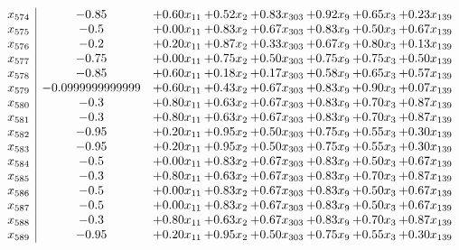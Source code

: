 \documentclass[8pt]{article}
\begin{document}
\[\begin{array}{c| c c@{\hskip 2pt} c@{\hskip 2pt} c@{\hskip 2pt} c@{\hskip 2pt} c@{\hskip 2pt} c@{\hskip 2pt} }
 x_{574}   &  -0.85 & +  0.60 x_{11} & +  0.52 x_{2} & +  0.83 x_{303} & +  0.92 x_{9} & +  0.65 x_{3} & +  0.23 x_{139}\\
 x_{575}   &  -0.5 & +  0.00 x_{11} & +  0.83 x_{2} & +  0.67 x_{303} & +  0.83 x_{9} & +  0.50 x_{3} & +  0.67 x_{139}\\
 x_{576}   &  -0.2 & +  0.20 x_{11} & +  0.87 x_{2} & +  0.33 x_{303} & +  0.67 x_{9} & +  0.80 x_{3} & +  0.13 x_{139}\\
 x_{577}   &  -0.75 & +  0.00 x_{11} & +  0.75 x_{2} & +  0.50 x_{303} & +  0.75 x_{9} & +  0.75 x_{3} & +  0.50 x_{139}\\
 x_{578}   &  -0.85 & +  0.60 x_{11} & +  0.18 x_{2} & +  0.17 x_{303} & +  0.58 x_{9} & +  0.65 x_{3} & +  0.57 x_{139}\\
 x_{579}   &  -0.0999999999999 & +  0.60 x_{11} & +  0.43 x_{2} & +  0.67 x_{303} & +  0.83 x_{9} & +  0.90 x_{3} & +  0.07 x_{139}\\
 x_{580}   &  -0.3 & +  0.80 x_{11} & +  0.63 x_{2} & +  0.67 x_{303} & +  0.83 x_{9} & +  0.70 x_{3} & +  0.87 x_{139}\\
 x_{581}   &  -0.3 & +  0.80 x_{11} & +  0.63 x_{2} & +  0.67 x_{303} & +  0.83 x_{9} & +  0.70 x_{3} & +  0.87 x_{139}\\
 x_{582}   &  -0.95 & +  0.20 x_{11} & +  0.95 x_{2} & +  0.50 x_{303} & +  0.75 x_{9} & +  0.55 x_{3} & +  0.30 x_{139}\\
 x_{583}   &  -0.95 & +  0.20 x_{11} & +  0.95 x_{2} & +  0.50 x_{303} & +  0.75 x_{9} & +  0.55 x_{3} & +  0.30 x_{139}\\
 x_{584}   &  -0.5 & +  0.00 x_{11} & +  0.83 x_{2} & +  0.67 x_{303} & +  0.83 x_{9} & +  0.50 x_{3} & +  0.67 x_{139}\\
 x_{585}   &  -0.3 & +  0.80 x_{11} & +  0.63 x_{2} & +  0.67 x_{303} & +  0.83 x_{9} & +  0.70 x_{3} & +  0.87 x_{139}\\
 x_{586}   &  -0.5 & +  0.00 x_{11} & +  0.83 x_{2} & +  0.67 x_{303} & +  0.83 x_{9} & +  0.50 x_{3} & +  0.67 x_{139}\\
 x_{587}   &  -0.5 & +  0.00 x_{11} & +  0.83 x_{2} & +  0.67 x_{303} & +  0.83 x_{9} & +  0.50 x_{3} & +  0.67 x_{139}\\
 x_{588}   &  -0.3 & +  0.80 x_{11} & +  0.63 x_{2} & +  0.67 x_{303} & +  0.83 x_{9} & +  0.70 x_{3} & +  0.87 x_{139}\\
 x_{589}   &  -0.95 & +  0.20 x_{11} & +  0.95 x_{2} & +  0.50 x_{303} & +  0.75 x_{9} & +  0.55 x_{3} & +  0.30 x_{139}\\

\end{array}\]
\end{document}
